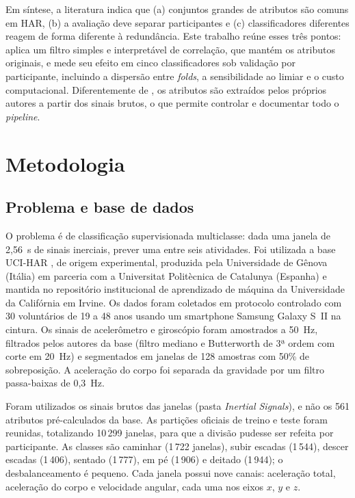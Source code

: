 \documentclass[conference]{IEEEtran}
\begin{document}
Em síntese, a literatura indica que (a) conjuntos grandes de atributos são comuns em HAR, (b) a avaliação deve separar participantes e (c) classificadores diferentes reagem de forma diferente à redundância. Este trabalho reúne esses três pontos: aplica um filtro simples e interpretável de correlação, que mantém os atributos originais, e mede seu efeito em cinco classificadores sob validação por participante, incluindo a dispersão entre \textit{folds}, a sensibilidade ao limiar e o custo computacional. Diferentemente de \cite{Anguita2013}, os atributos são extraídos pelos próprios autores a partir dos sinais brutos, o que permite controlar e documentar todo o \textit{pipeline}.

\section{Metodologia}
\label{sec:metodologia}

\subsection{Problema e base de dados}
O problema é de classificação supervisionada multiclasse: dada uma janela de 2,56~s de sinais inerciais, prever uma entre seis atividades. Foi utilizada a base UCI-HAR \cite{UCI-HAR,Anguita2013}, de origem experimental, produzida pela Universidade de Gênova (Itália) em parceria com a Universitat Politècnica de Catalunya (Espanha) e mantida no repositório institucional de aprendizado de máquina da Universidade da Califórnia em Irvine. Os dados foram coletados em protocolo controlado com 30 voluntários de 19 a 48 anos usando um smartphone Samsung Galaxy S~II na cintura. Os sinais de acelerômetro e giroscópio foram amostrados a 50~Hz, filtrados pelos autores da base (filtro mediano e Butterworth de 3ª ordem com corte em 20~Hz) e segmentados em janelas de 128 amostras com 50\% de sobreposição. A aceleração do corpo foi separada da gravidade por um filtro passa-baixas de 0,3~Hz.

Foram utilizados os sinais brutos das janelas (pasta \textit{Inertial Signals}), e não os 561 atributos pré-calculados da base. As partições oficiais de treino e teste foram reunidas, totalizando 10\,299 janelas, para que a divisão pudesse ser refeita por participante. As classes são caminhar (1\,722 janelas), subir escadas (1\,544), descer escadas (1\,406), sentado (1\,777), em pé (1\,906) e deitado (1\,944); o desbalanceamento é pequeno. Cada janela possui nove canais: aceleração total, aceleração do corpo e velocidade angular, cada uma nos eixos $x$, $y$ e $z$.
\end{document}
